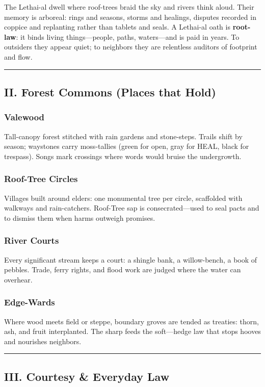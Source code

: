 \documentclass[11pt]{article}
\begin{document}
The Lethai-al dwell where roof-trees braid the sky and rivers think aloud. Their memory is arboreal: rings and seasons, storms and healings, disputes recorded in coppice and replanting rather than tablets and seals. A Lethai-al oath is \textbf{root-law}: it binds living things---people, paths, waters---and is paid in years. To outsiders they appear quiet; to neighbors they are relentless auditors of footprint and flow.

\medskip\hrule\medskip

\subsection{II. Forest Commons (Places that Hold)}

\subsubsection*{Valewood}
Tall-canopy forest stitched with rain gardens and stone-steps. Trails shift by season; waystones carry moss-tallies (green for open, gray for HEAL, black for trespass). Songs mark crossings where words would bruise the undergrowth.

\subsubsection*{Roof-Tree Circles}
Villages built around elders: one monumental tree per circle, scaffolded with walkways and rain-catchers. Roof-Tree sap is consecrated---used to seal pacts and to dismiss them when harms outweigh promises.

\subsubsection*{River Courts}
Every significant stream keeps a court: a shingle bank, a willow-bench, a book of pebbles. Trade, ferry rights, and flood work are judged where the water can overhear.

\subsubsection*{Edge-Wards}
Where wood meets field or steppe, boundary groves are tended as treaties: thorn, ash, and fruit interplanted. The sharp feeds the soft---hedge law that stops hooves and nourishes neighbors.

\medskip\hrule\medskip

\subsection{III. Courtesy \& Everyday Law}
\end{document}
